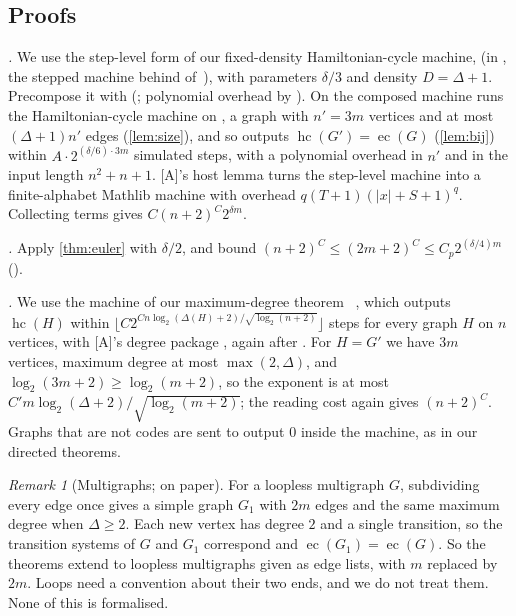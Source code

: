 \documentclass[10pt]{amsart}
\theoremstyle{plain}
\theoremstyle{definition}
\theoremstyle{remark}
\newtheorem{remark}[theorem]{Remark}
\numberwithin{equation}{section}
\newcommand{\A}{\textup{[A]}}
\newcommand{\EC}{\operatorname{ec}}
\newcommand{\HC}{\operatorname{hc}}
\begin{document}
\subsection{Proofs}
\emph{.} We use the step-level form of our fixed-density Hamiltonian-cycle machine,
 (in , the stepped machine behind 
of~\cite{Tulsyan26}), with parameters $\delta/3$ and density $D=\Delta+1$. Precompose it with
 (; polynomial overhead by ). On  the
composed machine runs the Hamiltonian-cycle machine on , a graph with
$n'=3m$ vertices and at most $(\Delta+1)n'$ edges (\cref{lem:size}), and so outputs
$\HC(G')=\EC(G)$ (\cref{lem:bij}) within $A\cdot2^{(\delta/6)\cdot3m}$ simulated steps, with a
polynomial overhead in $n'$ and in the input length $n^2+n+1$. \A's host lemma
 turns the step-level machine into a finite-alphabet Mathlib machine with
overhead $q(T+1)(|x|+S+1)^q$. Collecting terms gives $C(n+2)^C2^{\delta m}$.

\emph{.} Apply \cref{thm:euler} with $\delta/2$, and bound
$(n+2)^C\le(2m+2)^C\le C_p2^{(\delta/4)m}$ ().

\emph{.} We use the machine  of our maximum-degree theorem
~\cite{Tulsyan26}, which outputs $\HC(H)$ within
$\lfloor C2^{Cn\log_2(\Delta(H)+2)/\sqrt{\log_2(n+2)}}\rfloor$ steps for every graph $H$ on $n$
vertices, with \A's degree package , again after . For $H=G'$ we
have $3m$ vertices, maximum degree at most $\max(2,\Delta)$, and $\log_2(3m+2)\ge\log_2(m+2)$, so the
exponent is at most $C'm\log_2(\Delta+2)/\sqrt{\log_2(m+2)}$; the reading cost again gives
$(n+2)^C$. Graphs that are not codes are sent to output $0$ inside the machine, as in our directed
theorems.

\begin{remark}[Multigraphs; on paper]\label{rem:multi}
For a loopless multigraph $G$, subdividing every edge once gives a simple graph $G_1$ with $2m$ edges
and the same maximum degree when $\Delta\ge2$. Each new vertex has degree $2$ and a single
transition, so the transition systems of $G$ and $G_1$ correspond and $\EC(G_1)=\EC(G)$. So the
theorems extend to loopless multigraphs given as edge lists, with $m$ replaced by $2m$. Loops need a
convention about their two ends, and we do not treat them. None of this is formalised.
\end{remark}
\end{document}
